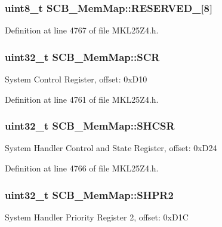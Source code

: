 \subsubsection[{\texorpdfstring{R\+E\+S\+E\+R\+V\+E\+D\+\_\+3}{RESERVED_3}}]{\setlength{\rightskip}{0pt plus 5cm}uint8\+\_\+t S\+C\+B\+\_\+\+Mem\+Map\+::\+R\+E\+S\+E\+R\+V\+E\+D\+\_\mbox{[}8\mbox{]}}\hypertarget{struct_s_c_b___mem_map_ada5d25c6c4f20fabcc3bb03db9bee4dd}{}\label{struct_s_c_b___mem_map_ada5d25c6c4f20fabcc3bb03db9bee4dd}


Definition at line 4767 of file M\+K\+L25\+Z4.\+h.

\subsubsection[{\texorpdfstring{S\+CR}{SCR}}]{\setlength{\rightskip}{0pt plus 5cm}uint32\+\_\+t S\+C\+B\+\_\+\+Mem\+Map\+::\+S\+CR}\hypertarget{struct_s_c_b___mem_map_ac8d0a0d974bde944d42429065dd2f44a}{}\label{struct_s_c_b___mem_map_ac8d0a0d974bde944d42429065dd2f44a}
System Control Register, offset\+: 0x\+D10 

Definition at line 4761 of file M\+K\+L25\+Z4.\+h.

\subsubsection[{\texorpdfstring{S\+H\+C\+SR}{SHCSR}}]{\setlength{\rightskip}{0pt plus 5cm}uint32\+\_\+t S\+C\+B\+\_\+\+Mem\+Map\+::\+S\+H\+C\+SR}\hypertarget{struct_s_c_b___mem_map_ae2b73d4b9744b878527466ec57dbfdb7}{}\label{struct_s_c_b___mem_map_ae2b73d4b9744b878527466ec57dbfdb7}
System Handler Control and State Register, offset\+: 0x\+D24 

Definition at line 4766 of file M\+K\+L25\+Z4.\+h.

\subsubsection[{\texorpdfstring{S\+H\+P\+R2}{SHPR2}}]{\setlength{\rightskip}{0pt plus 5cm}uint32\+\_\+t S\+C\+B\+\_\+\+Mem\+Map\+::\+S\+H\+P\+R2}\hypertarget{struct_s_c_b___mem_map_a1636322022eb10e4acedf40018708b68}{}\label{struct_s_c_b___mem_map_a1636322022eb10e4acedf40018708b68}
System Handler Priority Register 2, offset\+: 0x\+D1C 

